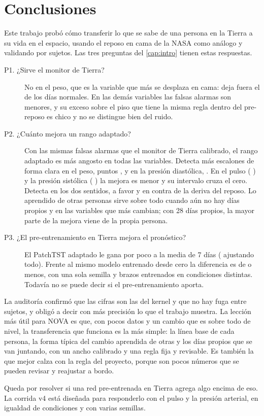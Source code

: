 \chapter{Conclusiones}\label{cap:conclusiones}

Este trabajo probó cómo transferir lo que se sabe de una persona en la Tierra a su vida en el espacio, usando el reposo
en cama de la NASA como análogo y validando por sujetos. Las tres preguntas del \cref{cap:intro} tienen estas
respuestas.

\begin{description}
\item[P1. ¿Sirve el monitor de Tierra?] No en el peso, que es la variable que más se desplaza en cama: deja fuera el
  \pct{} de los días normales. En las demás variables las falsas alarmas son menores, y su
  exceso sobre el piso que tiene la misma regla dentro del pre-reposo es chico y no se distingue bien del ruido.
\item[P2. ¿Cuánto mejora un rango adaptado?] Con las mismas falsas alarmas que el monitor de Tierra calibrado, el rango
  adaptado es más angosto en todas las variables. Detecta más escalones de forma clara en el peso,
   puntos , y en la presión diastólica, 
  . En el pulso ( ) y la presión sistólica
  ( ) la mejora es menor y su intervalo cruza el cero. Detecta en los
  dos sentidos, a favor y en contra de la deriva del reposo. Lo aprendido de otras personas sirve sobre todo cuando
  aún no hay días propios y en las variables que más cambian; con 28 días propios, la mayor parte de la mejora viene de
  la propia persona.
\item[P3. ¿El pre-entrenamiento en Tierra mejora el pronóstico?] El PatchTST adaptado le gana por poco a la media de
  7 días ( ajustando todo). Frente al mismo modelo entrenado desde cero la diferencia es de
   o menos, con una sola semilla y brazos entrenados en condiciones distintas. Todavía no se
  puede decir si el pre-entrenamiento aporta.
\end{description}

La auditoría confirmó que las cifras son las del kernel y que no hay fuga entre sujetos, y obligó a decir con más
precisión lo que el trabajo muestra. La lección más útil para NOVA es que, con pocos datos y un cambio que es sobre
todo de nivel, la transferencia que funciona es la más simple: la línea base de cada persona, la forma típica del
cambio aprendida de otras y los días propios que se van juntando, con un ancho calibrado y una regla fija y revisable.
Es también la que mejor calza con la regla del proyecto, porque son pocos números que se pueden revisar y reajustar a
bordo.

Queda por resolver si una red pre-entrenada en Tierra agrega algo encima de eso. La corrida v4 está diseñada para
responderlo con el pulso y la presión arterial, en igualdad de condiciones y con varias semillas.
